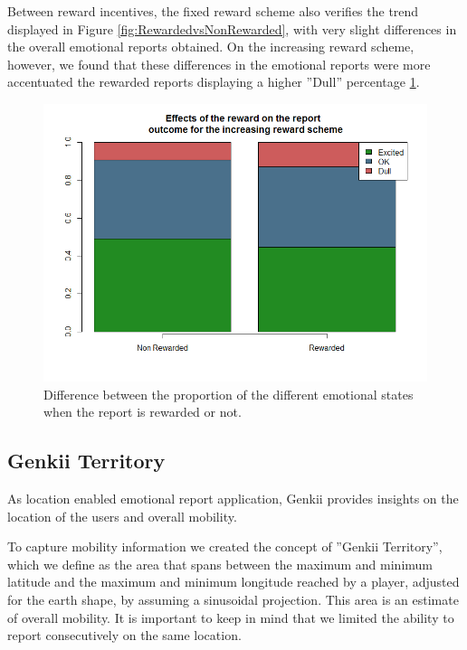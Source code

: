 \documentclass[letterpaper]{article}
\begin{document}
Between reward incentives, the fixed reward scheme also verifies the trend displayed in Figure \ref{fig:RewardedvsNonRewarded}, with very slight differences in the overall emotional reports obtained. On the increasing reward scheme, however, we found that these differences in the emotional reports were more accentuated the rewarded reports displaying a higher ''Dull'' percentage \ref{fig:RewardedsIncreasing}.

\begin{figure}[htb]
	\begin{center}
		\includegraphics[width=1\linewidth]{images/RewardsIncreasing}
		\caption{Difference between the proportion of  the different emotional states when the report is rewarded or not.\label{fig:RewardedsIncreasing}}
	\end{center}
\end{figure}




\subsection{Genkii Territory}

As location enabled emotional report application, Genkii provides insights on the location of the users and overall mobility.

To capture mobility information we created the concept of ''Genkii Territory'', which we define as the area that spans between the maximum and minimum latitude and the maximum and minimum longitude reached by a player, adjusted for the earth shape, by assuming a sinusoidal projection. This area is an estimate of overall mobility.
It is important to keep in mind that we limited the ability to report consecutively on the same location.
\end{document}
